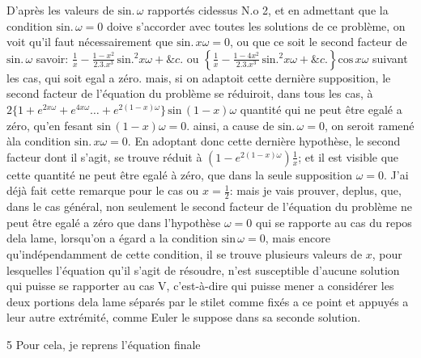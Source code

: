 \documentclass[11pt,a4paper]{article}
\begin{document}
D'après les valeurs de $\text{sin.}\,\omega$ rapportés cidessus N.o 2, et en admettant que la
condition $\text{sin.}\,\omega = 0$ doive s'accorder avec toutes les solutions de ce problème, on voit
qu'il faut nécessairement que $\text{sin.}\,x\omega = 0$, ou que ce soit le second facteur de $\text{sin.}\,\omega$
savoir: $\frac{1}{x} - \frac{1-x^2}{2.3.x^3}\,\text{sin.}^2 x\omega + \&c.$ ou $\left\{\frac{1}{x} - \frac{1-4x^2}{2.3.x^3}\,\text{sin.}^2 x\omega + \&c.\right\}\text{cos}\,x\omega$ suivant les cas, qui soit
egal a zéro. mais, si on adaptoit cette dernière supposition, le second facteur
de l'équation du problème se réduiroit, dans tous les cas, à $2\{1 + e^{2x\omega} + e^{4x\omega} \ldots + e^{2(1-x)\omega}\}\,\text{sin}\,(1-x)\omega$
quantité qui ne peut être egalé a zéro, qu'en fesant $\text{sin}\,(1-x)\omega = 0$. ainsi, a cause
de $\text{sin.}\,\omega = 0$, on seroit ramené àla condition $\text{sin.}\,x\omega = 0$. En adoptant donc cette
dernière hypothèse, le second facteur dont il s'agit, se trouve réduit à $(1-e^{2(1-x)\omega})\frac{1}{x}$;
et il est visible que cette quantité ne peut être egalé à zéro, que dans la
seule supposition $\omega = 0$. J'ai déjà fait cette remarque pour le cas ou $x = \frac{1}{2}$: mais
je vais prouver, deplus, que, dans le cas général, non seulement 
le second facteur de l'équation du problème ne peut être egalé a zéro que
dans l'hypothèse $\omega = 0$ qui se rapporte au cas du repos dela lame, lorsqu'on a
égard a la condition $\text{sin}\,\omega = 0$, mais encore qu'indépendamment de cette condition,
il se trouve plusieurs valeurs de $x$, pour lesquelles l'équation qu'il s'agit de
résoudre, n'est susceptible d'aucune solution qui puisse se rapporter au cas V,
c'est-à-dire qui puisse mener a considérer les deux portions dela lame
séparés par le stilet comme fixés a ce point et appuyés a leur autre
extrémité, comme Euler le suppose dans sa seconde solution.

5 Pour cela, je reprens l'équation finale
\end{document}
